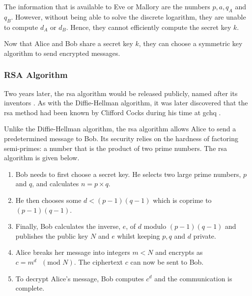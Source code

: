 The information that is available to Eve or Mallory are the numbers $p, a, q_{A}$ and $q_{B}$. However, without being able to solve the discrete logarithm, they are unable to compute $d_A$ or $d_B$. Hence, they cannot efficiently compute the secret key $k$.  

Now that Alice and Bob share a secret key $k$, they can choose a symmetric key algorithm to send encrypted messages.



\subsubsection*{RSA Algorithm}

Two years later, the \ac{rsa} algorithm would be released publicly, named after its inventors \cite{rivest1978method}. As with the Diffie-Hellman algorithm, it was later discovered that the \ac{rsa} method had been known by Clifford Cocks during his time at \ac{gchq} \cite{Cocks1973}. 

Unlike the Diffie-Hellman algorithm, the \ac{rsa} algorithm allows Alice to send a predetermined message to Bob. Its security relies on the hardness of factoring semi-primes: a number that is the product of two prime numbers. The \ac{rsa} algorithm is given below.


\begin{algorithm}
\begin{enumerate}
	\item Bob needs to first choose a secret key. He selects two large prime numbers, $p$ and $q$, and calculates $n = p \times q$.
	\item He then chooses some $d < (p-1)(q-1)$ which is coprime to $(p-1)(q-1)$.
	\item Finally, Bob calculates the inverse, $e$, of $d$ modulo $(p-1)(q-1)$ and publishes the public key $N$ and $e$ whilst keeping $p,q$ and $d$ private.
	\item Alice breaks her message into integers $m < N$ and encrypts as $c = m^d\text{ }(\text{mod }N)$. The ciphertext $c$ can now be sent to Bob.
	\item To decrypt Alice's message, Bob computes $c^d$ and the communication is complete. 
\end{enumerate}   
\end{algorithm}

